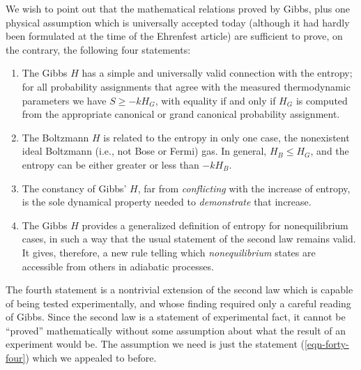 \documentclass[]{article}
\begin{document}
We wish to point out that the mathematical relations proved by Gibbs, plus one physical assumption which is universally accepted today (although it had hardly been formulated at the time of the Ehrenfest article) are sufficient to prove, on the contrary, the following four statements:

\begin{enumerate}
\renewcommand{\theenumi}{\Roman{enumi}}%

\item The Gibbs $H$ has a simple and universally valid connection with the entropy; for all probability assignments that agree with the measured thermodynamic parameters we have $S \geq- kH_{ G }$, with equality if and only if $H _{ G }$ is computed from the appropriate canonical or grand canonical probability assignment.

\item The Boltzmann $H$ is related to the entropy in only one case, the nonexistent ideal Boltzmann (i.e., not Bose or Fermi) gas. In general, $H _{ B } \leq H _{ G }$, and the entropy can be either greater or less than $- kH _{ B }$. 

\item The constancy of Gibbs' $H$, far from \emph{conflicting} with the increase of entropy, is the sole dynamical property needed to \emph{demonstrate} that increase. 

\item The Gibbs $H$ provides a generalized definition of entropy for nonequilibrium cases, in such a way that the usual statement of the second law remains valid. It gives, therefore, a new rule telling which \emph{nonequilibrium} states are accessible from others in adiabatic processes.
\end{enumerate}

The fourth statement is a nontrivial extension of the second law which is capable of being tested experimentally, and whose finding required only a careful reading of Gibbs. Since the second law is a statement of experimental fact, it cannot be ``proved'' mathematically without some assumption about what the result of an experiment would be. The assumption we need is just the statement (\ref{eqn-forty-four}) which we appealed to before. 
\end{document}

